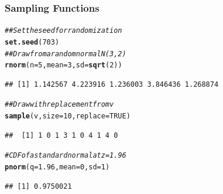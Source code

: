\documentclass{beamer}\usepackage[]{graphicx}\usepackage[]{xcolor}
\makeatletter
\newcommand{\hlnum}[1]{\textcolor[rgb]{0.686,0.059,0.569}{#1}}%
\newcommand{\hlcom}[1]{\textcolor[rgb]{0.678,0.584,0.686}{\textit{#1}}}%
\newcommand{\hlstd}[1]{\textcolor[rgb]{0.345,0.345,0.345}{#1}}%
\newcommand{\hlkwc}[1]{\textcolor[rgb]{0.333,0.667,0.333}{#1}}%
\newcommand{\hlkwd}[1]{\textcolor[rgb]{0.737,0.353,0.396}{\textbf{#1}}}%
\newenvironment{kframe}{%
 \def\at@end@of@kframe{}%
 \ifinner\ifhmode%
  \def\at@end@of@kframe{\end{minipage}}%
  \begin{minipage}{\columnwidth}%
 \fi\fi%
 \def\FrameCommand##1{\hskip\@totalleftmargin \hskip-\fboxsep
 \colorbox{shadecolor}{##1}\hskip-\fboxsep
     \hskip-\linewidth \hskip-\@totalleftmargin \hskip\columnwidth}%
 \MakeFramed {\advance\hsize-\width
   \@totalleftmargin\z@ \linewidth\hsize
   \@setminipage}}%
 {\par\unskip\endMakeFramed%
 \at@end@of@kframe}
\newenvironment{knitrout}{}{} %
\makeatother
\begin{document}
\begin{frame}[fragile]\frametitle{Sampling Functions}
\begin{knitrout}\footnotesize
{}\color{fgcolor}\begin{kframe}
\begin{alltt}
\hlcom{## Set the seed for randomization}
\hlkwd{set.seed}\hlstd{(}\hlnum{703}\hlstd{)}
\hlcom{## Draw from a random normal N(3, 2)}
\hlkwd{rnorm}\hlstd{(}\hlkwc{n} \hlstd{=} \hlnum{5}\hlstd{,} \hlkwc{mean} \hlstd{=} \hlnum{3}\hlstd{,} \hlkwc{sd} \hlstd{=} \hlkwd{sqrt}\hlstd{(}\hlnum{2}\hlstd{))}
\end{alltt}
\begin{verbatim}
## [1] 1.142567 4.223916 1.236003 3.846436 1.268874
\end{verbatim}
\begin{alltt}
\hlcom{## Draw with replacement from v}
\hlkwd{sample}\hlstd{(v,} \hlkwc{size} \hlstd{=} \hlnum{10}\hlstd{,} \hlkwc{replace} \hlstd{=} \hlnum{TRUE}\hlstd{)}
\end{alltt}
\begin{verbatim}
##  [1] 1 0 1 3 1 0 4 1 4 0
\end{verbatim}
\begin{alltt}
\hlcom{# CDF of a standard normal at z = 1.96}
\hlkwd{pnorm}\hlstd{(}\hlkwc{q} \hlstd{=} \hlnum{1.96}\hlstd{,} \hlkwc{mean} \hlstd{=} \hlnum{0}\hlstd{,} \hlkwc{sd} \hlstd{=} \hlnum{1}\hlstd{)}
\end{alltt}
\begin{verbatim}
## [1] 0.9750021
\end{verbatim}
\end{kframe}
\end{knitrout}
\end{frame}
\end{document}
